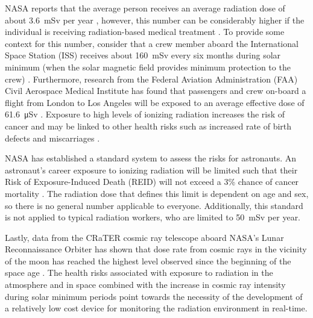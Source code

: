 NASA reports that the average person receives an average radiation dose of about \SI{3.6}{\milli\sievert} per year \cite{nasa-dose}, however, this number can be considerably higher if the individual is receiving radiation-based medical treatment \cite{ncrp}.
To provide some context for this number, consider that a crew member aboard the International Space Station (ISS) receives about \SI{160}{\milli\sievert} every six months during solar minimum (when the solar magnetic field provides minimum protection to the crew) \cite{nasa-dose}.
Furthermore, research from the Federal Aviation Administration (FAA) Civil Aerospace Medical Institute has found that passengers and crew on-board a flight from London to Los Angeles will be exposed to an average effective dose of \SI{61.6}{\micro\sievert} \cite{faa}. Exposure to high levels of ionizing radiation increases the risk of cancer and may be linked to other health risks such as increased rate of birth defects and miscarriages \cite{flightatt}. 

NASA has established a standard system to assess the risks for astronauts.
An astronaut's career exposure to ionizing radiation will be limited such that their Risk of Exposure-Induced Death (REID) will not exceed a 3\% chance of cancer mortality \cite{nasa-reid}. The radiation dose that defines this limit is dependent on age and sex, so there is no general number applicable to everyone. Additionally, this standard is not applied to typical radiation workers, who are limited to \SI{50}{\milli\sievert} per year.

Lastly, data from the CRaTER cosmic ray telescope aboard NASA’s Lunar Reconnaissance Orbiter has shown that dose rate from cosmic rays in the vicinity of the moon has reached the highest level observed since the beginning of the space age \cite{crater}. The health risks associated with exposure to radiation in the atmosphere and in space combined with the increase in cosmic ray intensity during solar minimum periods point towards the necessity of the development of a relatively low cost device for monitoring the radiation environment in real-time.


